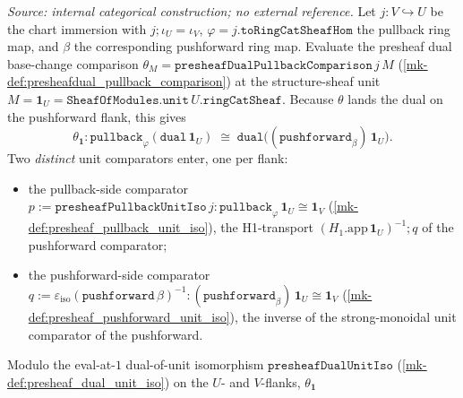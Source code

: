 \begin{lemma}\label{mk-lem:presheafdualunitiso_pullback_natural}
  \leanok

  \textit{Source: internal categorical construction; no external reference.}
  Let \(j : V \hookrightarrow U\) be the chart immersion with \(j \mathbin{;} \iota_U = \iota_V\),
  \(\varphi = j.\mathtt{toRingCatSheafHom}\) the pullback ring map, and \(\beta\) the corresponding
  pushforward ring map. Evaluate the presheaf dual base-change comparison
  \(\theta_M = \mathtt{presheafDualPullbackComparison}\,j\,M\)
  (\ref{mk-def:presheafdual_pullback_comparison}) at the structure-sheaf unit
  \(M = \mathbf 1_U = \mathtt{SheafOfModules.unit}\,U.\mathtt{ringCatSheaf}\). Because \(\theta\) lands
  the dual on the pushforward flank, this gives
  \[
    \theta_{\mathbf 1} : \mathtt{pullback}_\varphi(\mathtt{dual}\,\mathbf 1_U)
      \;\cong\; \mathtt{dual}\bigl((\mathtt{pushforward}_\beta)\,\mathbf 1_U\bigr).
  \]
  Two \emph{distinct} unit comparators enter, one per flank:
  \begin{itemize}
    \item the pullback-side comparator
      \(p := \mathtt{presheafPullbackUnitIso}\,j : \mathtt{pullback}_\varphi\,\mathbf 1_U \cong \mathbf 1_V\)
      (\ref{mk-def:presheaf_pullback_unit_iso}), the H1-transport \((H_1.\mathrm{app}\,\mathbf 1_U)^{-1}
      \mathbin{;} q\) of the pushforward comparator;
    \item the pushforward-side comparator
      \(q := \varepsilon_{\mathrm{iso}}(\mathtt{pushforward}\,\beta)^{-1} :
        (\mathtt{pushforward}_\beta)\,\mathbf 1_U \cong \mathbf 1_V\)
      (\ref{mk-def:presheaf_pushforward_unit_iso}), the inverse of the strong-monoidal unit comparator
      of the pushforward.
  \end{itemize}
  Modulo the eval-at-\(1\) dual-of-unit isomorphism \(\mathtt{presheafDualUnitIso}\)
  (\ref{mk-def:presheaf_dual_unit_iso}) on the \(U\)- and \(V\)-flanks, \(\theta_{\mathbf 1}\)

\end{lemma}
